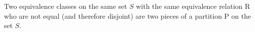 \begin{eg}
	Two equivalence classes on the same set $S$ with the same equivalence relation R who are not equal (and therefore disjoint) are two pieces of a partition P on the set $S$.
\end{eg}











































